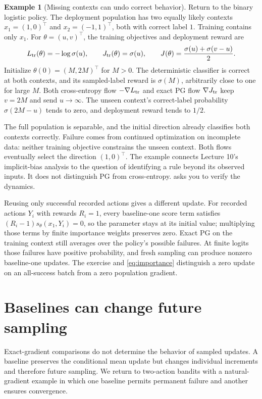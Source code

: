 \documentclass[11pt,twoside]{article}
\theoremstyle{definition}
\newtheorem{example}[theorem]{Example}
\theoremstyle{remark}
\begin{document}
\begin{example}[Missing contexts can undo correct behavior]
\label{ex:missing-contexts}
Return to the binary logistic policy. The deployment population has two
equally likely contexts
$x_1=(1,0)^\top$ and $x_2=(-1,1)^\top$, both with correct label $1$.
Training contains only $x_1$. For $\theta=(u,v)^\top$, the training
objectives and deployment reward are
\[
 L_{\rm tr}(\theta)=-\log\sigma(u),\qquad
 J_{\rm tr}(\theta)=\sigma(u),\qquad
 J(\theta)=\frac{\sigma(u)+\sigma(v-u)}2.
\]
Initialize $\theta(0)=(M,2M)^\top$ for $M>0$. The deterministic classifier
is correct at both contexts, and its sampled-label reward is $\sigma(M)$,
arbitrarily close to one for large $M$.
Both cross-entropy flow $-\nabla L_{\rm tr}$ and exact PG flow
$\nabla J_{\rm tr}$ keep $v=2M$ and send $u\to\infty$.
The unseen context's correct-label probability $\sigma(2M-u)$ tends
to zero, and deployment reward tends to $1/2$.
\end{example}

The full population is separable, and the initial direction already
classifies both contexts correctly. Failure comes from continued optimization
on incomplete data: neither training objective constrains the unseen
context. Both flows eventually select the direction $(1,0)^\top$.
The example connects Lecture 10's implicit-bias analysis to the question
of identifying a rule beyond its observed inputs. It does not distinguish
PG from cross-entropy.
 asks you to verify the dynamics.

Reusing only successful recorded actions gives a different update.
For recorded actions $Y_i$ with rewards $R_i=1$, every baseline-one score term satisfies
$(R_i-1)s_\theta(x_1,Y_i)=0$, so the parameter stays at its initial
value; multiplying those terms by finite importance weights preserves zero.
Exact PG on the training context still averages over the policy's possible
failures. At finite logits those failures have positive probability, and
fresh sampling can produce nonzero baseline-one updates.
The exercise and \cref{eq:importance} distinguish a zero update on an
all-success batch from a zero population gradient.

\section{Baselines can change future sampling}
\label{sec:baselines}

Exact-gradient comparisons do not determine the behavior of sampled
updates. A baseline preserves the conditional mean update but changes
individual increments and therefore future sampling. We return to
two-action bandits with a natural-gradient example in which one baseline
permits permanent failure and another ensures convergence.
\end{document}
